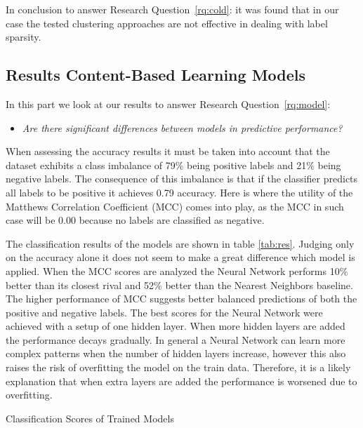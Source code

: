 In conclusion to answer Research Question~\ref{rq:cold}: it was found that in our case the tested clustering approaches are not effective in dealing with label sparsity.

\subsection{Results Content-Based Learning Models}
\label{ssec:rcblm}

In this part we look at our results to answer Research Question~\ref{rq:model}:
\begin{itemize}
	\item[] \em Are there significant differences between models in predictive performance?
\end{itemize}

\noindent When assessing the accuracy results it must be taken into account that the dataset exhibits a class imbalance of 79\% being positive labels and 21\% being negative labels.
The consequence of this imbalance is that if the classifier predicts all labels to be positive it achieves 0.79 accuracy.
Here is where the utility of the Matthews Correlation Coefficient (MCC) comes into play, as the MCC in such case will be 0.00 because no labels are classified as negative.

The classification results of the models are shown in table \ref{tab:res}.
Judging only on the accuracy alone it does not seem to make a great difference which model is applied.
When the MCC scores are analyzed the Neural Network performs 10\% better than its closest rival and 52\% better than the Nearest Neighbors baseline.
The higher performance of MCC suggests better balanced predictions of both the positive and negative labels.
The best scores for the Neural Network were achieved with a setup of one hidden layer.
When more hidden layers are added the performance decays gradually.
In general a Neural Network can learn more complex patterns when the number of hidden layers increase, however this also raises the risk of overfitting the model on the train data.
Therefore, it is a likely explanation that when extra layers are added the performance is worsened due to overfitting.

\begin{table}[h]
\begin{footnotesize}

\end{footnotesize}
\caption{\label{tab:res} \footnotesize{Classification Scores of Trained Models}}
\end{table}

